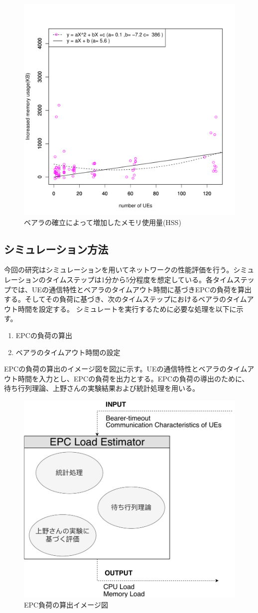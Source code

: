 \documentclass[a4j]{ujarticle}
\begin{document}
\begin{figure}[htbp]
	\centering
	\includegraphics[width=0.7\hsize]{hss_memory.pdf}
  \caption{ベアラの確立によって増加したメモリ使用量(HSS)}
	\label{hss_memory}
\end{figure}

\clearpage
\subsection{シミュレーション方法}
今回の研究はシミュレーションを用いてネットワークの性能評価を行う。シミュレーションのタイムステップは1分から5分程度を想定している。各タイムステップでは、UEの通信特性とベアラのタイムアウト時間に基づきEPCの負荷を算出する。そしてその負荷に基づき、次のタイムステップにおけるベアラのタイムアウト時間を設定する。
シミュレートを実行するために必要な処理を以下に示す。
\begin{enumerate}
	\item EPCの負荷の算出
  \item ベアラのタイムアウト時間の設定
\end{enumerate}

EPCの負荷の算出のイメージ図を図\ref{epc_load_estimator}に示す。UEの通信特性とベアラのタイムアウト時間を入力とし、EPCの負荷を出力とする。EPCの負荷の導出のために、待ち行列理論、上野さんの実験結果および統計処理を用いる。
\begin{figure}[htbp]
	\centering
	\includegraphics[width=0.7\hsize]{epc_load_estimator.pdf}
  \caption{EPC負荷の算出イメージ図}
	\label{epc_load_estimator}
\end{figure}
\end{document}
